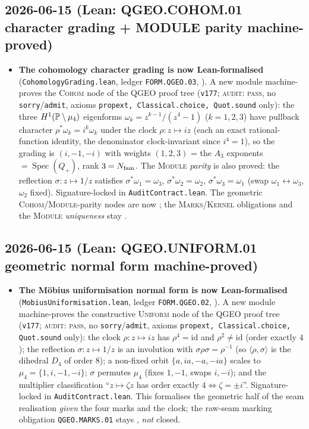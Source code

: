 \subsection*{2026-06-15 (Lean: QGEO.COHOM.01 character grading + MODULE parity machine-proved)}
\begin{itemize}
\item \textbf{The cohomology character grading is now Lean-formalised}
  (\texttt{CohomologyGrading.lean}, ledger \texttt{FORM.QGEO.03}, \mO). A new module machine-proves the
  \textsc{Cohom} node of the QGEO proof tree (\texttt{v177}; \textsc{audit: pass}, no
  \texttt{sorry}/\texttt{admit}, axioms \texttt{propext, Classical.choice, Quot.sound} only): the three
  $H^1(\mathbb{P}\setminus\mu_4)$ eigenforms $\omega_k=z^{k-1}/(z^4-1)$ ($k{=}1,2,3$) have pullback character
  $\rho^*\omega_k=i^k\omega_k$ under the clock $\rho:z\mapsto iz$ (each an exact rational-function identity,
  the denominator clock-invariant since $i^4{=}1$), so the grading is $(i,-1,-i)$ with weights $(1,2,3)$ =
  the $A_3$ exponents $=\operatorname{Spec}(Q_+)$, rank $3=N_{\mathrm{fam}}$. The \textsc{Module} \emph{parity} is also
  proved: the reflection $\sigma:z\mapsto1/z$ satisfies $\sigma^*\omega_1=\omega_3$,
  $\sigma^*\omega_2=\omega_2$, $\sigma^*\omega_3=\omega_1$ (swap $\omega_1\!\leftrightarrow\!\omega_3$,
  $\omega_2$ fixed). Signature-locked in \texttt{AuditContract.lean}. The geometric \textsc{Cohom}/\textsc{Module}-parity
  nodes are now \mE; the \textsc{Marks}/\textsc{Kernel} obligations and the \textsc{Module} \emph{uniqueness}
  stay \mO.
\end{itemize}

\subsection*{2026-06-15 (Lean: QGEO.UNIFORM.01 geometric normal form machine-proved)}
\begin{itemize}
\item \textbf{The M\"obius uniformisation normal form is now Lean-formalised}
  (\texttt{Mobius\allowbreak Uniformisation.lean}, ledger \texttt{FORM.QGEO.02}, \mO). A new module machine-proves the
  constructive \textsc{Uniform} node of the QGEO proof tree (\texttt{v177}; \textsc{audit: pass}, no
  \texttt{sorry}/\texttt{admit}, axioms \texttt{propext, Classical.choice, Quot.sound} only): the clock
  $\rho:z\mapsto iz$ has $\rho^4{=}\mathrm{id}$ and $\rho^2{\neq}\mathrm{id}$ (order exactly $4$); the
  reflection $\sigma:z\mapsto1/z$ is an involution with $\sigma\rho\sigma=\rho^{-1}$ (so $\langle\rho,\sigma
  \rangle$ is the dihedral $D_4$ of order $8$); a non-fixed orbit $\{a,ia,-a,-ia\}$ scales to
  $\mu_4=\{1,i,-1,-i\}$; $\sigma$ permutes $\mu_4$ (fixes $1,-1$, swaps $i,-i$); and the multiplier
  classification ``$z\mapsto\zeta z$ has order exactly $4\Leftrightarrow\zeta=\pm i$''. Signature-locked in
  \texttt{AuditContract.lean}. This formalises the geometric half of the seam realisation \emph{given} the
  four marks and the clock; the raw-seam marking obligation \texttt{QGEO.MARKS.01} stays \mO, \emph{not}
  closed.
\end{itemize}

